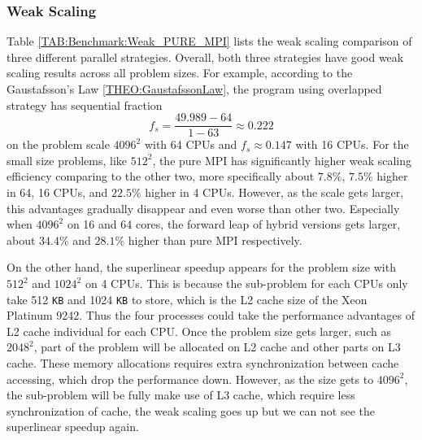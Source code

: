 
\subsubsection{Weak Scaling}

Table \ref{TAB:Benchmark:Weak_PURE_MPI} lists the weak scaling comparison of three different parallel strategies.
Overall, both three strategies have good weak scaling results across all problem sizes.
For example, according to the Gaustafsson's Law \ref{THEO:GaustafssonLaw}, the program using
overlapped strategy has sequential fraction 
$$f_s = \frac{49.989 - 64}{1-63} \approx 0.222$$
on the problem scale $4096^2$ with 64 CPUs
and $f_s \approx 0.147$ with 16 CPUs.
For the small size problems, like $512^2$, the pure MPI has significantly higher weak scaling efficiency comparing to the other two,
more specifically about $7.8\%$, $7.5\%$ higher in 64, 16 CPUs, and $22.5\%$ higher in 4 CPUs.
However, as the scale gets larger, this advantages gradually disappear and even worse than other two.
Especially when $4096^2$ on 16 and 64 cores, the forward leap of hybrid versions gets larger, about $34.4\%$ and $28.1\%$ higher than 
pure MPI respectively.

On the other hand, the superlinear speedup appears for the problem size with $512^2$ and $1024^2$ on 4 CPUs.
This is because the sub-problem for each CPUs only take 512 \texttt{KB} and 1024 \texttt{KB} to store, 
which is the L2 cache size of the Xeon Platinum 9242.
Thus the four processes could take the performance advantages of L2 cache individual for each CPU.
Once the problem size gets larger, such as $2048^2$, part of the problem will be allocated on L2 cache and other parts on L3 cache.
These memory allocations requires extra synchronization between cache accessing, which drop the performance down.
However, as the size gets to $4096^2$, the sub-problem will be fully make use of L3 cache, which require less synchronization of cache, 
the weak scaling goes up but we can not see the superlinear speedup again.

